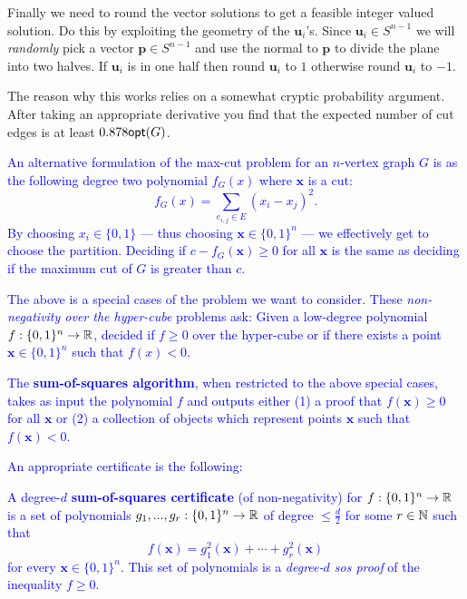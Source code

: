 \begin{example}
Finally we need to round the vector solutions to get a feasible integer valued solution. Do this by exploiting the geometry of the $\mathbf{u}_i$'s. Since $\mathbf{u}_i \in S^{n-1}$ we will \emph{randomly} pick a vector $\mathbf{p} \in S^{n-1}$ and use the normal to $\mathbf{p}$ to divide the plane into two halves. If $\mathbf{u}_i$ is in one half then round $\mathbf{u}_i$ to $1$ otherwise round $\mathbf{u}_i$ to $-1$. 

The reason why this works relies on a somewhat cryptic probability argument. After taking an appropriate derivative you find that the expected number of cut edges is at least $0.878\mathsf{opt}(G)$. 

\textcolor{blue}{An alternative formulation of the max-cut problem for an $n$-vertex graph $G$ is as the following degree two polynomial $f_G(x)$ where $\mathbf{x}$ is a cut:
\[f_G(x) = \sum_{e_{i,j} \in E} (x_i - x_j)^2.\]
By choosing $x_i \in \{0,1\}$ --- thus choosing $\mathbf{x} \in \{0,1\}^n$ --- we effectively get to choose the partition. Deciding if $c - f_G(\mathbf{x}) \geq 0$ for all $\mathbf{x}$ is the same as deciding if the maximum cut of $G$ is greater than $c$.}  
\end{example}

\textcolor{blue}{The above is a special cases of the problem we want to consider. These \emph{non-negativity over the hyper-cube} problems ask: Given a low-degree polynomial $f:\{0,1\}^n \rightarrow \mathbb{R}$, decided if $f \geq 0$ over the hyper-cube or if there exists a point $\mathbf{x} \in \{0,1\}^n$ such that $f(x) < 0$. 
}

\textcolor{blue}{
\begin{definition}
The \textbf{sum-of-squares algorithm}, when restricted to the above special cases, takes as input the polynomial $f$ and outputs either (1) a proof that $f(\mathbf{x}) \geq 0$ for all $\mathbf{x}$ or (2) a collection of objects which represent points $\mathbf{x}$ such that $f(\mathbf{x}) < 0$. 
\end{definition}
An appropriate certificate is the following:
\begin{definition}
A degree-$d$ \textbf{sum-of-squares certificate} (of non-negativity) for $f: \{0,1\}^n \rightarrow \mathbb{R}$ is a set of polynomials $g_1, ..., g_r: \{0,1\}^n \rightarrow \mathbb{R}$ of degree $\leq \frac{d}{2}$ for some $r \in \mathbb{N}$ such that 
\[f(\mathbf{x}) = g_1^2(\mathbf{x}) + \cdots + g_r^2(\mathbf{x})\]
for every $\mathbf{x} \in \{0,1\}^n$. This set of polynomials is a \emph{degree-$d$ sos proof} of the inequality $f \geq 0$.   
\end{definition}
}

